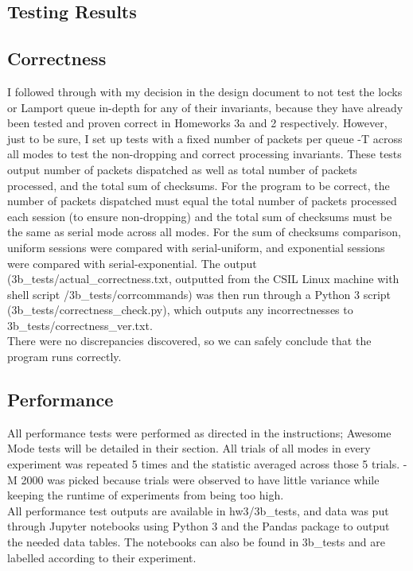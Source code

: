 \documentclass{article}
\begin{document}
\begin{adjustwidth}{-2cm}{-2cm}
\section{Testing Results}
\subsection{Correctness}
I followed through with my decision in the design document to not test the locks or Lamport queue in-depth for any of their invariants, because they have already been tested and proven correct in Homeworks 3a and 2 respectively. However, just to be sure, I set up tests with a fixed number of packets per queue -T across all modes to test the non-dropping and correct processing invariants. These tests output number of packets dispatched as well as total number of packets processed, and the total sum of checksums. For the program to be correct, the number of packets dispatched must equal the total number of packets processed each session (to ensure non-dropping) and the total sum of checksums must be the same as serial mode across all modes. For the sum of checksums comparison, uniform sessions were compared with serial-uniform, and exponential sessions were compared with serial-exponential. The output (3b\_tests/actual\_correctness.txt, outputted from the CSIL Linux machine with shell script /3b\_tests/corrcommands) was then run through a Python 3 script (3b\_tests/correctness\_check.py), which outputs any incorrectnesses to 3b\_tests/correctness\_ver.txt.\\
There were no discrepancies discovered, so we can safely conclude that the program runs correctly.

\subsection{Performance}
All performance tests were performed as directed in the instructions; Awesome Mode tests will be detailed in their section. All trials of all modes in every experiment was repeated 5 times and the statistic averaged across those 5 trials. -M 2000 was picked because trials were observed to have little variance while keeping the runtime of experiments from being too high.\\
All performance test outputs are available in hw3/3b\_tests, and data was put through Jupyter notebooks using Python 3 and the Pandas package to output the needed data tables. The notebooks can also be found in 3b\_tests and are labelled according to their experiment. 

\end{adjustwidth}
\end{document}
